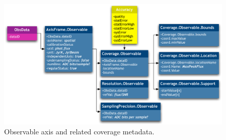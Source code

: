 			\begin{figure}[tbp]
			\begin{center}
				\includegraphics[width=\columnwidth]
				{fig/AxisFrame-Observable-DM}
			\end{center}
			\caption[Observable axis metadata]
			{Observable axis and related coverage metadata.}
			\label{figAxisFrameObservable}
			\end{figure}

